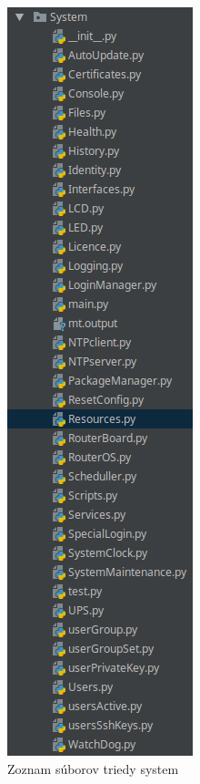 \begin{figure}[H]
\centering
\includegraphics[scale=0.6]{../text/system.png}
\caption{Zoznam súborov triedy system}
\label{fig:system}
\end{figure}
